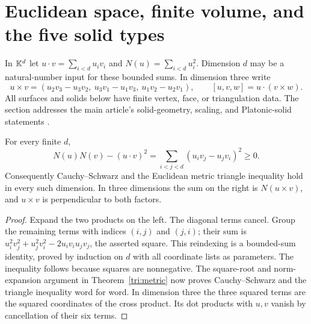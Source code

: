 \section{Euclidean space, finite volume, and the five solid types}
\label{sec:solids}
In $\mathbb K^d$ let $u\cdot v=\sum_{i<d}u_iv_i$ and
$N(u)=\sum_{i<d}u_i^2$. Dimension $d$ may be a natural-number input
for these bounded sums. In dimension three write
\[
 u\times v=(u_2v_3-u_3v_2,\ u_3v_1-u_1v_3,\ u_1v_2-u_2v_1),
 \qquad [u,v,w]=u\cdot(v\times w).
\]
All surfaces and solids below have finite vertex, face, or triangulation
data. The section addresses the main article's solid-geometry, scaling,
and Platonic-solid statements \cite{wiki,euclid,platoniccore}.

\begin{theorem}
\label{sol:gram}
For every finite $d$,
\[
 N(u)N(v)-(u\cdot v)^2=
       \sum_{i<j<d}(u_iv_j-u_jv_i)^2\ge0.
\]
Consequently Cauchy--Schwarz and the Euclidean metric triangle inequality
hold in every such dimension. In three dimensions the sum on the right
is $N(u\times v)$, and $u\times v$ is perpendicular to both factors.
\end{theorem}
\begin{proof}
Expand the two products on the left. The diagonal terms cancel. Group
the remaining terms with indices $(i,j)$ and $(j,i)$; their sum is
$u_i^2v_j^2+u_j^2v_i^2-2u_iv_iu_jv_j$, the asserted square.
This reindexing is a bounded-sum identity, proved by induction on $d$
with all coordinate lists as parameters. The inequality follows because
squares are nonnegative. The square-root and norm-expansion argument in
Theorem~\ref{tri:metric} now proves Cauchy--Schwarz and the triangle
inequality word for word. In dimension three the three squared terms
are the squared coordinates of the cross product. Its dot products with
$u,v$ vanish by cancellation of their six terms.
\end{proof}

